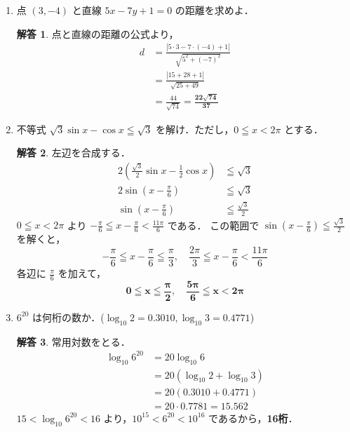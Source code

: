 \documentclass[dvipdfmx]{jlreq}
\theoremstyle{definition}
\newtheorem*{solution}{解答}
\begin{document}
\begin{enumerate}[label=(\arabic*)]
\newpage

    \item 点 $(3, -4)$ と直線 $5x - 7y + 1 = 0$ の距離を求めよ．
    \begin{solution}
    点と直線の距離の公式より，
    \begin{align*}
        d &= \frac{|5 \cdot 3 - 7 \cdot (-4) + 1|}{\sqrt{5^2 + (-7)^2}} \\
          &= \frac{|15 + 28 + 1|}{\sqrt{25 + 49}} \\
          &= \frac{44}{\sqrt{74}} = \bm{\frac{22\sqrt{74}}{37}}
    \end{align*}
    \end{solution}

\vspace{5mm}

    \item 不等式 $\sqrt{3}\sin x - \cos x \leqq \sqrt{3}$ を解け．ただし，$0 \leqq x < 2\pi$ とする．
    \begin{solution}
    左辺を合成する．
    \begin{align*}
        2 \left( \frac{\sqrt{3}}{2}\sin x - \frac{1}{2}\cos x \right) &\leqq \sqrt{3} \\
        2 \sin\left(x - \frac{\pi}{6}\right) &\leqq \sqrt{3} \\
        \sin\left(x - \frac{\pi}{6}\right) &\leqq \frac{\sqrt{3}}{2}
    \end{align*}
    $0 \leqq x < 2\pi$ より $\displaystyle -\frac{\pi}{6} \leqq x - \frac{\pi}{6} < \frac{11\pi}{6}$ である．
    この範囲で $\displaystyle \sin \left(x - \frac{\pi}{6}\right) \leqq \frac{\sqrt{3}}{2}$ を解くと，
    \[ -\frac{\pi}{6} \leqq x - \frac{\pi}{6} \leqq \frac{\pi}{3}, \quad \frac{2\pi}{3} \leqq x - \frac{\pi}{6} < \frac{11\pi}{6} \]
    各辺に $\displaystyle \frac{\pi}{6}$ を加えて，
    \[ \bm{0 \leqq x \leqq \frac{\pi}{2}, \quad \frac{5\pi}{6} \leqq x < 2\pi} \]
    \end{solution}

\vspace{5mm}

    \item $6^{20}$ は何桁の数か．($\log_{10} 2=0.3010, \log_{10} 3=0.4771$)
    \begin{solution}
    常用対数をとる．
    \begin{align*}
        \log_{10} 6^{20} &= 20 \log_{10} 6 \\
        &= 20 (\log_{10} 2 + \log_{10} 3) \\
        &= 20 (0.3010 + 0.4771) \\
        &= 20 \cdot 0.7781 = 15.562
    \end{align*}
    $15 < \log_{10} 6^{20} < 16$ より，$10^{15} < 6^{20} < 10^{16}$ であるから，\textbf{16桁}．
    \end{solution}


\end{enumerate}
\end{document}

